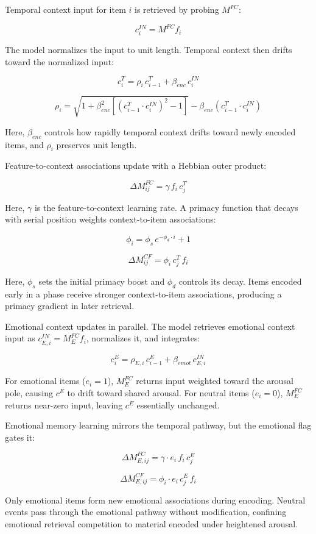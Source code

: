 \documentclass[
  man,
  floatsintext,
  longtable,
  nolmodern,
  notxfonts,
  notimes,
  draftfirst,
  colorlinks=true,linkcolor=blue,citecolor=blue,urlcolor=blue]{apa7}
\begin{document}
Temporal context input for item \(i\) is retrieved by probing
\(M^{FC}\):

\[
c^{IN}_i = M^{FC} f_i
\]

The model normalizes the input to unit length. Temporal context then
drifts toward the normalized input:

\[
c^T_i = \rho_i \, c^T_{i-1} + \beta_{enc} \, c^{IN}_i
\]

\[
\rho_i = \sqrt{1 + \beta_{enc}^2 \left[\left(c^T_{i-1} \cdot c^{IN}_i\right)^2 - 1\right]} - \beta_{enc} \left(c^T_{i-1} \cdot c^{IN}_i\right)
\]

Here, \(\beta_{enc}\) controls how rapidly temporal context drifts
toward newly encoded items, and \(\rho_i\) preserves unit length.

Feature-to-context associations update with a Hebbian outer product:

\[
\Delta M^{FC}_{ij} = \gamma \, f_i \, c^T_j
\]

Here, \(\gamma\) is the feature-to-context learning rate. A primacy
function that decays with serial position weights context-to-item
associations:

\[
\phi_i = \phi_s \, e^{-\phi_d \cdot i} + 1
\]

\[
\Delta M^{CF}_{ij} = \phi_i \, c^T_j \, f_i
\]

Here, \(\phi_s\) sets the initial primacy boost and \(\phi_d\) controls
its decay. Items encoded early in a phase receive stronger
context-to-item associations, producing a primacy gradient in later
retrieval.

Emotional context updates in parallel. The model retrieves emotional
context input as \(c^{IN}_{E,i} = M^{FC}_E f_i\), normalizes it, and
integrates:

\[
c^E_i = \rho_{E,i} \, c^E_{i-1} + \beta_{emot} \, c^{IN}_{E,i}
\]

For emotional items (\(e_i = 1\)), \(M^{FC}_E\) returns input weighted
toward the arousal pole, causing \(c^E\) to drift toward shared arousal.
For neutral items (\(e_i = 0\)), \(M^{FC}_E\) returns near-zero input,
leaving \(c^E\) essentially unchanged.

Emotional memory learning mirrors the temporal pathway, but the
emotional flag gates it:

\[
\Delta M^{FC}_{E,ij} = \gamma \cdot e_i \, f_i \, c^E_j
\]

\[
\Delta M^{CF}_{E,ij} = \phi_i \cdot e_i \, c^E_j \, f_i
\]

Only emotional items form new emotional associations during encoding.
Neutral events pass through the emotional pathway without modification,
confining emotional retrieval competition to material encoded under
heightened arousal.
\end{document}
